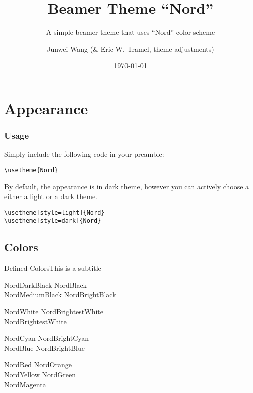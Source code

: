 \documentclass[compress, aspectratio=169]{beamer}
\title{Beamer Theme ``Nord''}
\subtitle{A simple beamer theme that uses ``Nord'' color scheme}
\author{Junwei Wang (\& Eric W. Tramel, theme adjustments)}
\date{\today}
\begin{document}
\begin{frame}
  \maketitle
\end{frame}


\section{Appearance}


\begin{frame}[fragile]
  \frametitle{Usage}
  Simply include the following code in your preamble:

  \begin{lstlisting}[basicstyle = \ttfamily\small]
\usetheme{Nord}
  \end{lstlisting}

  \bigskip

  By default, the appearance is in dark theme, however you can actively choose a either a light or a
  dark theme.

  \begin{lstlisting}[basicstyle = \ttfamily\small]
\usetheme[style=light]{Nord}
\usetheme[style=dark]{Nord}
  \end{lstlisting}

\end{frame}

\subsection{Colors}

\begin{frame}{Defined Colors}{This is a subtitle}
  \begin{description}
  \item[Polar Night]
    \textcolor{NordDarkBlack}{NordDarkBlack} \quad \textcolor{NordBlack}{NordBlack}\\
    \textcolor{NordMediumBlack}{NordMediumBlack} \quad \textcolor{NordBrightBlack}{NordBrightBlack}
  \item[Snow Storm]
    \textcolor{NordWhite}{NordWhite} \quad \textcolor{NordBrighterWhite}{NordBrightestWhite}\\
    \textcolor{NordBrightestWhite}{NordBrightestWhite}
  \item[Forest]
    \textcolor{NordCyan}{NordCyan} \quad \textcolor{NordBrightCyan}{NordBrightCyan}\\
    \textcolor{NordBlue}{NordBlue} \quad \textcolor{NordBrightBlue}{NordBrightBlue}
  \item[Aurora]
    \textcolor{NordRed}{NordRed} \quad \textcolor{NordOrange}{NordOrange} \\
    \textcolor{NordYellow}{NordYellow} \quad \textcolor{NordGreen}{NordGreen} \\
    \textcolor{NordMagenta}{NordMagenta}
  \end{description}
\end{frame}
\end{document}
